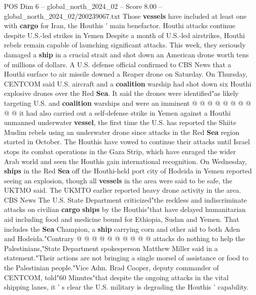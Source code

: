 \begin{textsample}{POS Dim 6 – global\_north\_2024\_02 – Score 8.00 – global\_north\_2024\_02/200239067.txt}
Those \textbf{vessels} have included at least one with \textbf{cargo} for Iran, the Houthis ' main benefactor.
Houthi attacks continue despite U.S.-led strikes in Yemen Despite a month of U.S.-led airstrikes, Houthi rebels remain capable of launching significant attacks.
This week, they seriously damaged a \textbf{ship} in a crucial strait and shot down an American drone worth tens of millions of dollars.
A U.S. defense official confirmed to CBS News that a Houthi surface to air missile downed a Reaper drone on Saturday.
On Thursday, CENTCOM said U.S. aircraft and a \textbf{coalition} warship had shot down six Houthi explosive drones over the Red \textbf{Sea}.
It said the drones were identified"as likely targeting U.S. and \textbf{coalition} warships and were an imminent @ @ @ @ @ @ @ @ @ @ it had also carried out a self-defense strike in Yemen against a Houthi unmanned underwater \textbf{vessel}, the first time the U.S. has reported the Shiite Muslim rebels using an underwater drone since attacks in the Red \textbf{Sea} region started in October.
The Houthis have vowed to continue their attacks until Israel stops its combat operations in the Gaza Strip, which have enraged the wider Arab world and seen the Houthis gain international recognition.
On Wednesday, \textbf{ships} in the Red \textbf{Sea} off the Houthi-held port city of Hodeida in Yemen reported seeing an explosion, though all \textbf{vessels} in the area were said to be safe, the UKTMO said.
The UKMTO earlier reported heavy drone activity in the area.
CBS News The U.S.
State Department criticized"the reckless and indiscriminate attacks on civilian \textbf{cargo} \textbf{ships} by the Houthis"that have delayed humanitarian aid including food and medicine bound for Ethiopia, Sudan and Yemen.
That includes the \textbf{Sea} Champion, a \textbf{ship} carrying corn and other aid to both Aden and Hodeida."Contrary @ @ @ @ @ @ @ @ @ @ attacks do nothing to help the Palestinians,"State Department spokesperson Matthew Miller said in a statement."Their actions are not bringing a single morsel of assistance or food to the Palestinian people."Vice Adm.
Brad Cooper, deputy commander of CENTCOM, told"60 Minutes"that despite the ongoing attacks in the vital shipping lanes, it ' s clear the U.S. military is degrading the Houthis ' capability.

\end{textsample}
